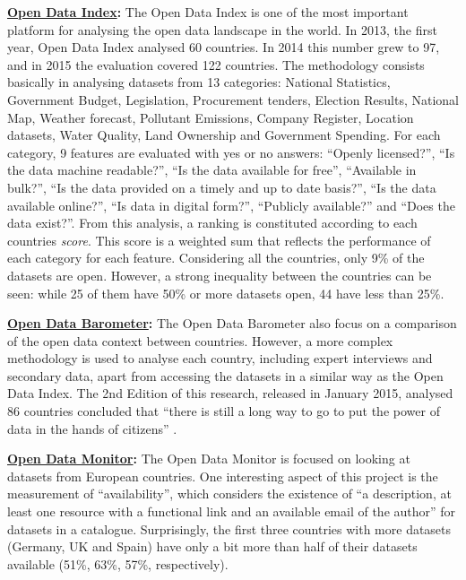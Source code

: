 \textbf{\href{http://index.okfn.org/}{Open Data Index}:} The Open Data Index is one of the most important platform for analysing the open data landscape in the world. In 2013, the first year, Open Data Index analysed 60 countries. In 2014 this number grew to 97, and in 2015 the evaluation covered 122 countries.
The methodology consists basically in analysing datasets from 13 categories: 
National Statistics, Government Budget, Legislation, Procurement tenders, Election Results, National Map, Weather forecast, Pollutant Emissions, Company Register, Location datasets, Water Quality, Land Ownership and Government Spending.
For each category, 9 features are evaluated with yes or no answers: ``Openly licensed?'', ``Is the data machine readable?'', ``Is the data available for free'',  ``Available in bulk?'', ``Is the data provided on a timely and up to date basis?'', ``Is the data available online?'', ``Is data in digital form?'', ``Publicly available?'' and ``Does the data exist?''.
From this analysis, a ranking is constituted according to each countries \emph{score}. 
This score is a weighted sum that reflects the performance of each category for each feature.
Considering all the countries, only 9\% of the datasets are open. 
However, a strong inequality between the countries can be seen: while 25 of them have 50\% or more datasets open, 44 have less than 25\%.

\textbf{\href{http://www.opendatabarometer.org/}{Open Data Barometer}:} The Open Data Barometer also focus on a comparison of the open data context between countries. However, a more complex methodology is used to analyse each country, including expert interviews and secondary data, apart from accessing the datasets in a similar way as the Open Data Index.
The 2nd Edition of this research, released in January 2015, analysed 86 countries concluded that ``there is still a long way to go to put the power of data in the hands of citizens''\cite{Davies2015} .

\textbf{\href{http://opendatamonitor.eu/}{Open Data Monitor}:} The Open Data Monitor is focused on looking at datasets from European countries. One interesting aspect of this project is the measurement of ``availability'', which considers the existence of ``a description, at least one resource with a functional link and an available email of the author'' for datasets in a catalogue.
Surprisingly, the first three countries with more datasets (Germany, UK and Spain) have only a bit more than half of their datasets available (51\%, 63\%, 57\%, respectively).

